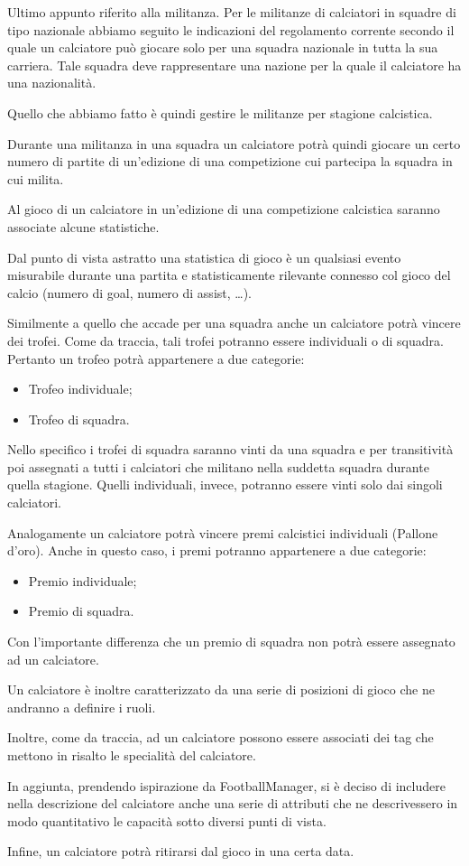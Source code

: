 Ultimo appunto riferito alla militanza. Per le militanze di calciatori in squadre di tipo
nazionale abbiamo seguito le indicazioni del regolamento corrente secondo il quale un calciatore
può giocare solo per una squadra nazionale in tutta la sua carriera. Tale squadra
deve rappresentare una nazione per la quale il calciatore ha una nazionalità.

Quello che abbiamo fatto è quindi gestire le militanze per stagione calcistica.

Durante una militanza in una squadra un calciatore potrà quindi giocare un certo numero di
partite di un'edizione di una competizione cui partecipa la squadra in cui milita.

Al gioco di un calciatore in un'edizione di una competizione calcistica saranno associate
alcune statistiche.

Dal punto di vista astratto una statistica di gioco è un qualsiasi evento misurabile durante
una partita e statisticamente rilevante connesso col gioco del calcio
(numero di goal, numero di assist, \dots).

Similmente a quello che accade per una squadra anche un calciatore potrà vincere dei trofei.
Come da traccia, tali trofei potranno essere individuali o di squadra.
Pertanto un trofeo potrà appartenere a due categorie:
\begin{itemize}
	\item Trofeo individuale;
	\item Trofeo di squadra.
\end{itemize}

Nello specifico i trofei di squadra saranno vinti da una squadra e per transitività poi
assegnati a tutti i calciatori che militano nella suddetta squadra durante quella stagione.
Quelli individuali, invece, potranno essere vinti solo dai singoli calciatori.

Analogamente un calciatore potrà vincere premi calcistici individuali (Pallone d'oro).
Anche in questo caso, i premi potranno appartenere a due categorie:
\begin{itemize}
	\item Premio individuale;
	\item Premio di squadra.
\end{itemize}

Con l'importante differenza che un premio di squadra non potrà essere assegnato ad un
calciatore.

Un calciatore è inoltre caratterizzato da una serie di posizioni di gioco che ne andranno a
definire i ruoli.

Inoltre, come da traccia, ad un calciatore possono essere associati dei tag che mettono in
risalto le specialità del calciatore.

In aggiunta, prendendo ispirazione da FootballManager, si è deciso di includere nella
descrizione del calciatore anche una serie di attributi che ne descrivessero in modo quantitativo
le capacità sotto diversi punti di vista.

Infine, un calciatore potrà ritirarsi dal gioco in una certa data.